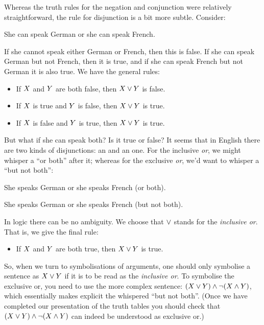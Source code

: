 Whereas the truth rules for the negation and conjunction were relatively straightforward, the rule for disjunction is a bit more subtle.
Consider:
\begin{earg}
\item[\ex{conj}] She can speak German or she can speak French.
\end{earg}
If she cannot speak either German or French, then this is false. If she can speak German but not French, then it is true, and if she can speak French but not German it is also true.
We have the general rules:
\begin{itemize}
\item If $X$ and $Y$ are both false, then $X\vee Y$ is false.
\item  If $X$ is true and $Y$ is false, then $X\vee Y$ is true.
\item  If $X$ is false and $Y$ is true, then $X\vee Y$ is true.
\end{itemize}

But what if she can speak both? Is it true or false?
It seems that in English there are two kinds of disjunctions: an  and an  one. For the inclusive \emph{or}, we might whisper a ``or both'' after it; whereas for the exclusive \emph{or}, we'd want to whisper a ``but not both'':
\begin{earg}
\item [\ex{inclor}] She speaks German or
she speaks French (or both).
\item [\ex{exclor}] She speaks German or
she speaks French (but not both).
\end{earg}

In logic there can be no ambiguity. We choose that $\vee$ stands for the \emph{inclusive or}.
That is, we give the final rule:
\begin{itemize}
\item If $X$ and $Y$ are both true, then $X\vee Y$ is true.
\end{itemize}

So, when we turn to symbolisations of arguments, one should only symbolise a sentence as $X\vee Y$ if it is to be read as the \emph{inclusive or}. To symbolise the exclusive or, you need to use the more complex sentence: $(X\vee Y)\mathbin{\wedge} \neg(X\mathbin{\wedge}Y)$, which essentially makes explicit the whispered ``but not both''. (Once we have completed our presentation of the truth tables you should check that $(X\vee Y)\mathbin{\wedge} \neg(X\mathbin{\wedge}Y)$ can indeed be understood as exclusive or.)

